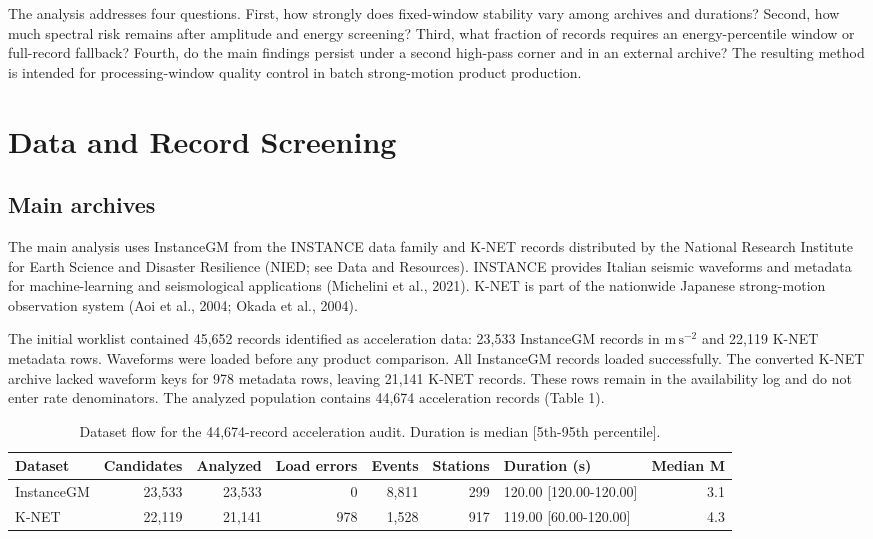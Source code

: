 \documentclass[12pt,letterpaper]{article}
\begin{document}
The analysis addresses four questions. First, how strongly does fixed-window stability vary among archives and durations? Second, how much spectral risk remains after amplitude and energy screening? Third, what fraction of records requires an energy-percentile window or full-record fallback? Fourth, do the main findings persist under a second high-pass corner and in an external archive? The resulting method is intended for processing-window quality control in batch strong-motion product production.

\section{Data and Record Screening}\label{data-and-record-screening}

\subsection{Main archives}\label{main-archives}

The main analysis uses InstanceGM from the INSTANCE data family and K-NET records distributed by the National Research Institute for Earth Science and Disaster Resilience (NIED; see Data and Resources). INSTANCE provides Italian seismic waveforms and metadata for machine-learning and seismological applications (Michelini et al., 2021). K-NET is part of the nationwide Japanese strong-motion observation system (Aoi et al., 2004; Okada et al., 2004).

The initial worklist contained 45,652 records identified as acceleration data: 23,533 InstanceGM records in \(\mathrm{m\,s^{-2}}\) and 22,119 K-NET metadata rows. Waveforms were loaded before any product comparison. All InstanceGM records loaded successfully. The converted K-NET archive lacked waveform keys for 978 metadata rows, leaving 21,141 K-NET records. These rows remain in the availability log and do not enter rate denominators. The analyzed population contains 44,674 acceleration records (Table 1).

\begin{table}[!htbp]
\centering
\caption{Dataset flow for the 44,674-record acceleration audit. Duration is median [5th-95th percentile].}
\label{tab:dataset}
\begin{singlespace}
\footnotesize
\setlength{\tabcolsep}{3pt}
\begin{tabular*}{\textwidth}{@{\extracolsep{\fill}}lrrrrrlr@{}}
\toprule
Dataset & Candidates & Analyzed & Load errors & Events & Stations & Duration (s) & Median M \\
\midrule
InstanceGM & 23,533 & 23,533 & 0 & 8,811 & 299 & 120.00 [120.00-120.00] & 3.1 \\
K-NET & 22,119 & 21,141 & 978 & 1,528 & 917 & 119.00 [60.00-120.00] & 4.3 \\
\bottomrule
\end{tabular*}
\end{singlespace}
\end{table}
\end{document}
